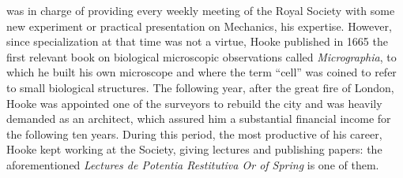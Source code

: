 was in charge of providing every weekly meeting of the Royal Society with some new experiment or practical presentation on Mechanics, his expertise. However, since specialization at that time was not a virtue, Hooke published in 1665 the first relevant book on biological microscopic observations called \emph{Micrographia}, to which he built his own microscope and where the term ``cell'' was coined to refer to small biological structures. The following year, after the great fire of London, Hooke was appointed one of the surveyors to rebuild the city and was heavily demanded as an architect, which assured him a substantial financial income for the following ten years. During this period, the most productive of his career, Hooke kept working at the Society, giving lectures and publishing papers: the aforementioned \emph{Lectures \emph{de Potentia Restitutiva} Or of Spring} is one of them. 
\begin{figure}[!ht]
	\centering
	\begin{center}
	\end{center}
	\label{fg:HookePortrai}
\end{figure}

